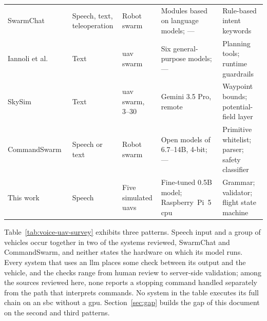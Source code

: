 \begin{table}[htbp]
\begin{tabularx}{\textwidth}{@{}>{\raggedright\arraybackslash}p{2.5cm} >{\raggedright\arraybackslash}p{1.7cm} >{\raggedright\arraybackslash}p{2.0cm} >{\raggedright\arraybackslash}X >{\raggedright\arraybackslash}X@{}}
SwarmChat~\cite{swarmchat2025} & Speech, text, teleoperation & Robot swarm & Modules based on language models; --- & Rule-based intent keywords \\
Iannoli et al.~\cite{iannoli2026} & Text & \gls{uav} swarm & Six general-purpose models; --- & Planning tools; runtime guardrails \\
SkySim~\cite{skysim2026} & Text & \gls{uav} swarm, 3--30 & Gemini 3.5 Pro, remote & Waypoint bounds; potential-field layer \\
Command\-Swarm~\cite{commandswarm2026} & Speech or text & Robot swarm & Open models of 6.7--14B, 4-bit; --- & Primitive whitelist; parser; safety classifier \\
\midrule
This work & Speech & Five simulated \glspl{uav} & Fine-tuned 0.5B model; Raspberry~Pi~5 \gls{cpu} & Grammar; validator; flight state machine \\
\bottomrule
\end{tabularx}
\end{table}

Table~\ref{tab:voice-uav-survey} exhibits three patterns. Speech input and a group of vehicles
occur together in two of the systems reviewed, SwarmChat and CommandSwarm, and neither states the
hardware on which its model runs. Every system that uses an \gls{llm} places some check
between its output and the vehicle, and the checks range from human review to server-side
validation; among the sources reviewed here, none reports a stopping command handled separately
from the path that interprets commands. No system in the table executes its full chain on an
\gls{sbc} without a \gls{gpu}. Section~\ref{sec:gap} builds the gap of this document on
the second and third patterns.

